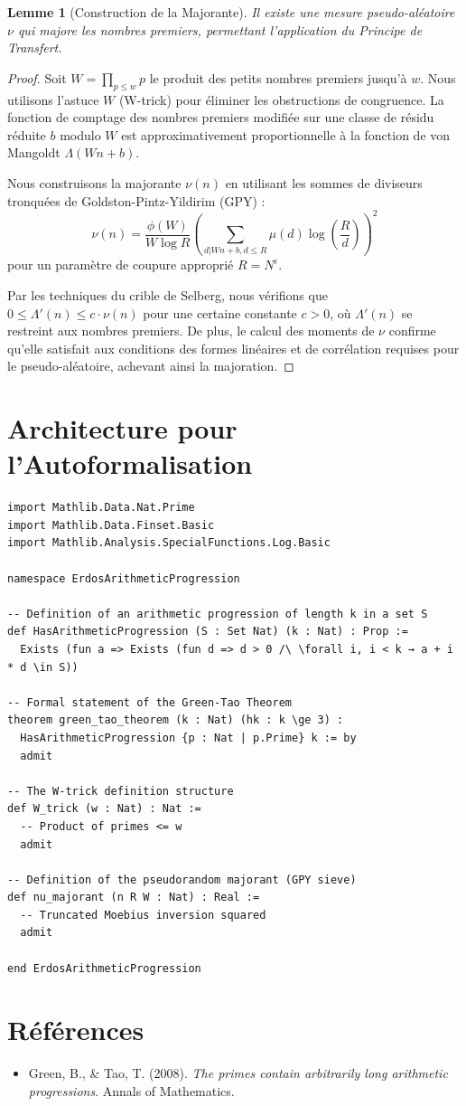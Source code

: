 \documentclass[12pt,a4paper]{article}
\newtheorem{lemma}{Lemme}
\begin{document}
\begin{lemma}[Construction de la Majorante]
Il existe une mesure pseudo-al\'eatoire $\nu$ qui majore les nombres premiers, permettant l'application du Principe de Transfert.
\end{lemma}
\begin{proof}
Soit $W = \prod_{p \leq w} p$ le produit des petits nombres premiers jusqu'\`a $w$. Nous utilisons l'astuce $W$ (W-trick) pour \'eliminer les obstructions de congruence. La fonction de comptage des nombres premiers modifi\'ee sur une classe de r\'esidu r\'eduite $b$ modulo $W$ est approximativement proportionnelle \`a la fonction de von Mangoldt $\Lambda(Wn + b)$.

Nous construisons la majorante $\nu(n)$ en utilisant les sommes de diviseurs tronqu\'ees de Goldston-Pintz-Yildirim (GPY) :
$$ \nu(n) = \frac{\phi(W)}{W \log R} \left( \sum_{d | Wn + b, d \leq R} \mu(d) \log\left(\frac{R}{d}\right) \right)^2 $$
pour un param\`etre de coupure appropri\'e $R = N^{\epsilon}$.

Par les techniques du crible de Selberg, nous v\'erifions que $0 \leq \Lambda'(n) \leq c \cdot \nu(n)$ pour une certaine constante $c>0$, o\`u $\Lambda'(n)$ se restreint aux nombres premiers. De plus, le calcul des moments de $\nu$ confirme qu'elle satisfait aux conditions des formes lin\'eaires et de corr\'elation requises pour le pseudo-al\'eatoire, achevant ainsi la majoration.
\end{proof}

\section{Architecture pour l'Autoformalisation}

\begin{verbatim}
import Mathlib.Data.Nat.Prime
import Mathlib.Data.Finset.Basic
import Mathlib.Analysis.SpecialFunctions.Log.Basic

namespace ErdosArithmeticProgression

-- Definition of an arithmetic progression of length k in a set S
def HasArithmeticProgression (S : Set Nat) (k : Nat) : Prop :=
  Exists (fun a => Exists (fun d => d > 0 /\ \forall i, i < k → a + i * d \in S))

-- Formal statement of the Green-Tao Theorem
theorem green_tao_theorem (k : Nat) (hk : k \ge 3) :
  HasArithmeticProgression {p : Nat | p.Prime} k := by
  admit

-- The W-trick definition structure
def W_trick (w : Nat) : Nat :=
  -- Product of primes <= w
  admit

-- Definition of the pseudorandom majorant (GPY sieve)
def nu_majorant (n R W : Nat) : Real :=
  -- Truncated Moebius inversion squared
  admit

end ErdosArithmeticProgression
\end{verbatim}

\section*{R\'ef\'erences}
\begin{itemize}
    \item Green, B., \& Tao, T. (2008). \textit{The primes contain arbitrarily long arithmetic progressions}. Annals of Mathematics.
\end{itemize}
\end{document}
